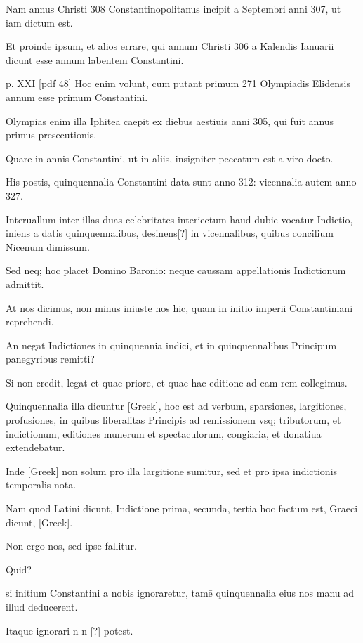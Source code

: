 \begin{parnumbers}
Nam annus Christi 308 Constantinopolitanus
incipit a Septembri anni 307, ut iam dictum est.

Et proinde ipsum, et alios errare, qui annum Christi 306 a Kalendis Ianuarii
dicunt esse annum labentem Constantini.

\clearpage
p. XXI [pdf 48]
Hoc enim volunt,
cum putant primum 271 Olympiadis Elidensis annum esse primum
Constantini.

Olympias enim illa Iphitea caepit ex diebus aestiuis
anni 305, qui fuit annus primus presecutionis.

Quare in annis
Constantini, ut in aliis, insigniter peccatum est a viro docto.

His
postis, quinquennalia Constantini data sunt anno 312: vicennalia
autem anno 327.

Interuallum inter illas duas celebritates interiectum
haud dubie vocatur Indictio, iniens a datis quinquennalibus,
desinens[?] in vicennalibus, quibus concilium Nicenum dimissum.

Sed neq; hoc placet Domino Baronio: neque caussam appellationis
Indictionum admittit.

At nos dicimus, non minus iniuste nos
hic, quam in initio imperii Constantiniani reprehendi.

An negat
Indictiones in quinquennia indici, et in quinquennalibus Principum
panegyribus remitti?

Si non credit, legat et quae priore, et quae
hac editione ad eam rem collegimus.

Quinquennalia illa dicuntur
\textgreek{[Greek]}, hoc est ad verbum, sparsiones, largitiones, profusiones, in
quibus liberalitas Principis ad remissionem vsq; tributorum, et indictionum,
editiones munerum et spectaculorum, congiaria, et donatiua
extendebatur.

Inde \textgreek{[Greek]} non solum pro illa largitione
sumitur, sed et pro ipsa indictionis temporalis nota.

Nam quod Latini
dicunt, Indictione prima, secunda, tertia hoc factum est, Graeci
dicunt, \textgreek{[Greek]}.

Non ergo nos, sed ipse fallitur.

Quid?

si initium Constantini a nobis ignoraretur, tamē quinquennalia
eius nos manu ad illud deducerent.

Itaque ignorari n n [?]
potest.


\end{parnumbers}
